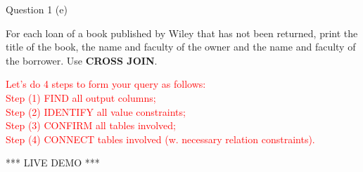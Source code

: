 \begin{frame}[fragile]{Question 1 (e)}

For each loan of a book published by Wiley that has not been returned, print the title of the book, the name and faculty of the owner and the name and faculty of the borrower. Use \textbf{CROSS JOIN}.
\vspace{15pt}

\textcolor{red}{Let's do 4 steps to form your query as follows:\\\vspace{5pt}
Step (1) FIND all output columns;\\
Step (2) IDENTIFY all value constraints;\\
Step (3) CONFIRM all tables involved;\\
Step (4) CONNECT tables involved (w. necessary relation constraints).}
\vspace{15pt}
\begin{center}
*** LIVE DEMO ***
\end{center}
\end{frame}

